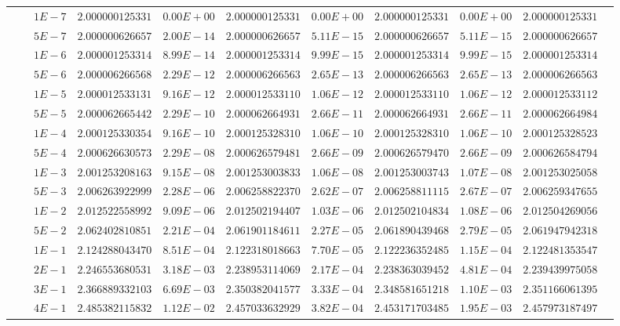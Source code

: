 \begin{landscape}
\begin{table}[ht]
{\begin{tabular}[c]{c|c|c|c|c|c|c|c|c|c|c}
& &$1E-7$ & $2.000000125331$ & $0.00E+00$ & $2.000000125331$ & $0.00E+00$ & $2.000000125331$ & $0.00E+00$ & $2.000000125331$ &  \\
& &$5E-7$ & $2.000000626657$ & $2.00E-14$ & $2.000000626657$ & $5.11E-15$ & $2.000000626657$ & $5.11E-15$ & $2.000000626657$ &  \\
& &$1E-6$ & $2.000001253314$ & $8.99E-14$ & $2.000001253314$ & $9.99E-15$ & $2.000001253314$ & $9.99E-15$ & $2.000001253314$ &  \\
& &$5E-6$ & $2.000006266568$ & $2.29E-12$ & $2.000006266563$ & $2.65E-13$ & $2.000006266563$ & $2.65E-13$ & $2.000006266563$ &  \\
& &$1E-5$ & $2.000012533131$ & $9.16E-12$ & $2.000012533110$ & $1.06E-12$ & $2.000012533110$ & $1.06E-12$ & $2.000012533112$ &  \\
& &$5E-5$ & $2.000062665442$ & $2.29E-10$ & $2.000062664931$ & $2.66E-11$ & $2.000062664931$ & $2.66E-11$ & $2.000062664984$ &  \\
& &$1E-4$ & $2.000125330354$ & $9.16E-10$ & $2.000125328310$ & $1.06E-10$ & $2.000125328310$ & $1.06E-10$ & $2.000125328523$ &  \\
& &$5E-4$ & $2.000626630573$ & $2.29E-08$ & $2.000626579481$ & $2.66E-09$ & $2.000626579470$ & $2.66E-09$ & $2.000626584794$ &  \\
& &$1E-3$ & $2.001253208163$ & $9.15E-08$ & $2.001253003833$ & $1.06E-08$ & $2.001253003743$ & $1.07E-08$ & $2.001253025058$ &  \\
& &$5E-3$ & $2.006263922999$ & $2.28E-06$ & $2.006258822370$ & $2.62E-07$ & $2.006258811115$ & $2.67E-07$ & $2.006259347655$ &  \\
& &$1E-2$ & $2.012522558992$ & $9.09E-06$ & $2.012502194407$ & $1.03E-06$ & $2.012502104834$ & $1.08E-06$ & $2.012504269056$ &  \\
& &$5E-2$ & $2.062402810851$ & $2.21E-04$ & $2.061901184611$ & $2.27E-05$ & $2.061890439468$ & $2.79E-05$ & $2.061947942318$ &  \\
& &$1E-1$ & $2.124288043470$ & $8.51E-04$ & $2.122318018663$ & $7.70E-05$ & $2.122236352485$ & $1.15E-04$ & $2.122481353547$ &  \\
& &$2E-1$ & $2.246553680531$ & $3.18E-03$ & $2.238953114069$ & $2.17E-04$ & $2.238363039452$ & $4.81E-04$ & $2.239439975058$ &  \\
& &$3E-1$ & $2.366889332103$ & $6.69E-03$ & $2.350382041577$ & $3.33E-04$ & $2.348581651218$ & $1.10E-03$ & $2.351166061395$ &  \\
& &$4E-1$ & $2.485382115832$ & $1.12E-02$ & $2.457033632929$ & $3.82E-04$ & $2.453171703485$ & $1.95E-03$ & $2.457973187497$ &  \\

\end{tabular}}
\end{table}
\end{landscape}
